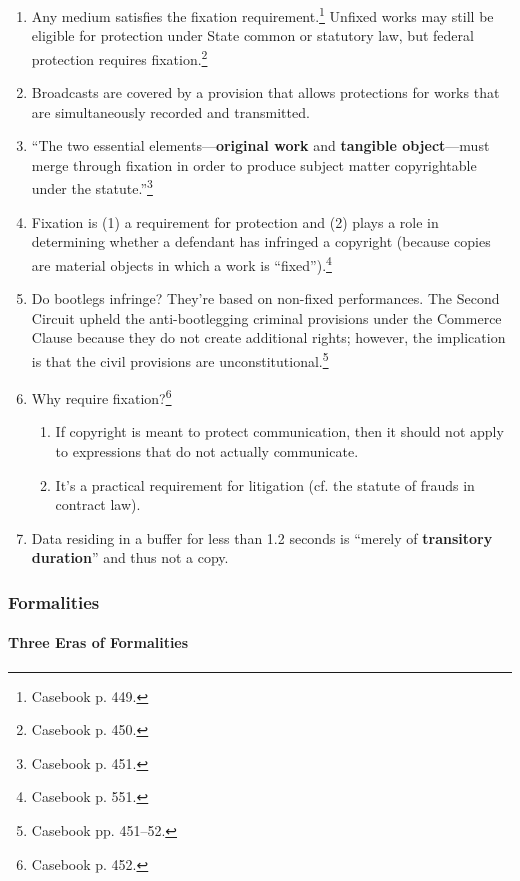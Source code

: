 \begin{enumerate}
    \item Any medium satisfies the fixation requirement.\footnote{Casebook p. 
    449.} Unfixed works may still be eligible for protection under State 
    common or statutory law, but federal protection requires 
    fixation.\footnote{Casebook p. 450.}
    \item Broadcasts are covered by a provision that allows protections for 
    works that are simultaneously recorded and transmitted.
    \item ``The two essential elements---\textbf{original work} and 
    \textbf{tangible object}---must merge through fixation in order to produce 
    subject matter copyrightable under the statute.''\footnote{Casebook p. 
    451.}
    \item Fixation is (1) a requirement for protection and (2) plays a role in 
    determining whether a defendant has infringed a copyright (because copies 
    are material objects in which a work is ``fixed'').\footnote{Casebook p. 
    551.}
    \item Do bootlegs infringe? They're based on non-fixed performances. The 
    Second Circuit upheld the anti-bootlegging criminal provisions under the 
    Commerce Clause because they do not create additional rights; however, the 
    implication is that the civil provisions are 
    unconstitutional.\footnote{Casebook pp. 451--52.}
    \item Why require fixation?\footnote{Casebook p. 452.}
    \begin{enumerate}
        \item If copyright is meant to protect communication, then it should 
        not apply to expressions that do not actually communicate.
        \item It's a practical requirement for litigation (cf. the statute of 
        frauds in contract law).
    \end{enumerate}
    \item Data residing in a buffer for less than 1.2 seconds is ``merely of 
    \textbf{transitory duration}'' and thus not a copy.
\end{enumerate}

\subsubsection{Formalities}

\paragraph{Three Eras of Formalities}

